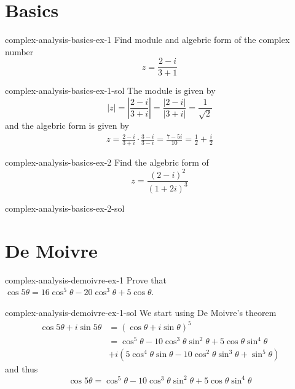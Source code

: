\documentclass[preview]{standalone}
\begin{document}
\genpage

\section{Basics}

\begin{snippetexercise}{complex-analysis-basics-ex-1}{}
    Find module and algebric form of the complex number 
    \[
        z = \frac{2-i}{3+1}
    \]
\end{snippetexercise}

\begin{snippetsolution}{complex-analysis-basics-ex-1-sol}{}
    The module is given by
    \[
        |z| = \left|\frac{2-i}{3+i}\right| = \frac{|2-i|}{|3+i|}
        = \frac{1}{\sqrt{2}}
    \]
    and the algebric form is given by
    \begin{align*}
        z = \frac{2-i}{3+i} \cdot \frac{3-i}{3-i} = \frac{7-5i}{10}
        = \frac{1}{2} + \frac{i}{2}
    \end{align*}
\end{snippetsolution}

\begin{snippetexercise}{complex-analysis-basics-ex-2}{}
    Find the algebric form of
    \[
        z = \frac{{(2-i)}^2}{{(1+2i)}^3}
    \]
\end{snippetexercise}

\begin{snippetsolution}{complex-analysis-basics-ex-2-sol}{}
    \todo
\end{snippetsolution}

\section{De Moivre}

\begin{snippetexercise}{complex-analysis-demoivre-ex-1}{} %
    Prove that \(\cos5\theta = 16\cos^5\theta - 20\cos^3\theta+5\cos\theta\).
\end{snippetexercise}

\begin{snippetsolution}{complex-analysis-demoivre-ex-1-sol}{}
    We start using De Moivre's theorem
    \begin{align*}
        \cos5\theta + i\sin5\theta &= (\cos\theta + i\sin\theta)^5 \\
        &= \cos^5\theta - 10\cos^3\theta\sin^2\theta + 5\cos\theta\sin^4\theta \\
            &+ i(5\cos^4\theta\sin\theta -10\cos^2\theta\sin^3\theta + \sin^5\theta)
    \end{align*}
    and thus
    \[ \cos5\theta = \cos^5\theta - 10\cos^3\theta\sin^2\theta + 5\cos\theta\sin^4\theta \]
\end{snippetsolution}
\end{document}
